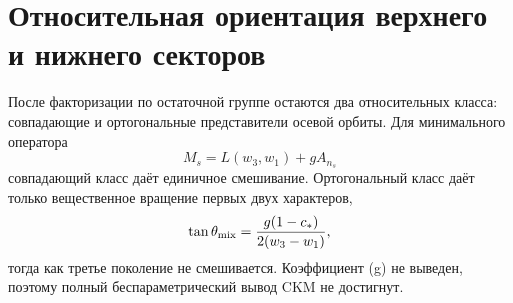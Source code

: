 \section*{Относительная ориентация верхнего и нижнего секторов}

После факторизации по остаточной группе остаются два относительных класса:
совпадающие и ортогональные представители осевой орбиты. Для минимального
оператора
\[
 M_s=L(w_3,w_1)+gA_{n_s}
\]
совпадающий класс даёт единичное смешивание. Ортогональный класс даёт только
вещественное вращение первых двух характеров,
\[
 \tan\theta_{\rm mix}=\frac{g(1-c_*)}{2(w_3-w_1)},
\]
тогда как третье поколение не смешивается. Коэффициент (g) не выведен,
поэтому полный беспараметрический вывод CKM не достигнут.